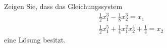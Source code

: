 Zeigen Sie, dass das Gleichungssystem
\begin{align*}
\frac{1}{2}x_1^3 - \frac{1}{8}x_2^3 = x_1 \\
\frac{1}{2}x_1^5 + \frac{1}{4}x_1^2x_2^4 + \frac{1}{4} = x_2
\end{align*}
eine Lösung besitzt.